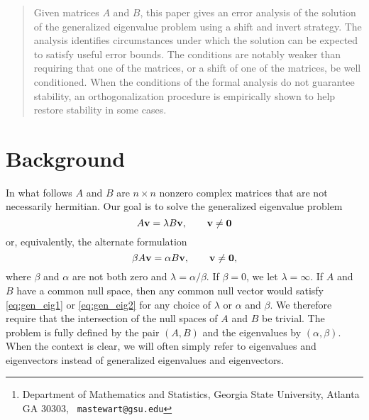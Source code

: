\documentclass[12pt]{article}
\author{Michael Stewart\thanks{Department of Mathematics and
    Statistics, Georgia State University, Atlanta GA 30303, {\tt
      mastewart@gsu.edu}}}
\def\vec#1{{\bf #1}}
\begin{document}
\maketitle
\begin{abstract}
  Given matrices $A$ and $B$, this paper gives an error analysis of
  the solution of the generalized eigenvalue problem using a shift and
  invert strategy.  The analysis identifies circumstances under which
  the solution can be expected to satisfy useful error bounds.  The
  conditions are notably weaker than requiring that one of the
  matrices, or a shift of one of the matrices, be well conditioned.
  When the conditions of the formal analysis do not guarantee
  stability, an orthogonalization procedure is empirically shown to
  help restore stability in some cases.
\end{abstract}
\pagestyle{myheadings}
\thispagestyle{plain}

\section{Background}
\label{sec:background}

In what follows $A$ and $B$ are $n\times n$ nonzero complex matrices
that are not necessarily hermitian.  Our goal is to solve the
generalized eigenvalue problem
\begin{equation}
  \label{eq:gen_eig1}
  A\vec{v} = \lambda B \vec{v}, \qquad \vec{v} \neq \vec{0}
\end{equation}
or, equivalently, the alternate formulation
\begin{equation}
  \label{eq:gen_eig2}
  \beta A \vec{v} = \alpha B \vec{v}, \qquad \vec{v}\neq \vec{0},
\end{equation}
where $\beta$ and $\alpha$ are not both zero and
$\lambda = \alpha/\beta$.  If $\beta = 0$, we let $\lambda = \infty$.
If $A$ and $B$ have a common null space, then any common null vector
would satisfy \eqref{eq:gen_eig1} or \eqref{eq:gen_eig2} for any
choice of $\lambda$ or $\alpha$ and $\beta$.  We therefore require
that the intersection of the null spaces of $A$ and $B$ be trivial.
The problem is fully defined by the pair $(A,B)$ and the eigenvalues
by $(\alpha, \beta)$.  When the context is clear, we will often simply
refer to eigenvalues and eigenvectors instead of generalized
eigenvalues and eigenvectors.
\end{document}
